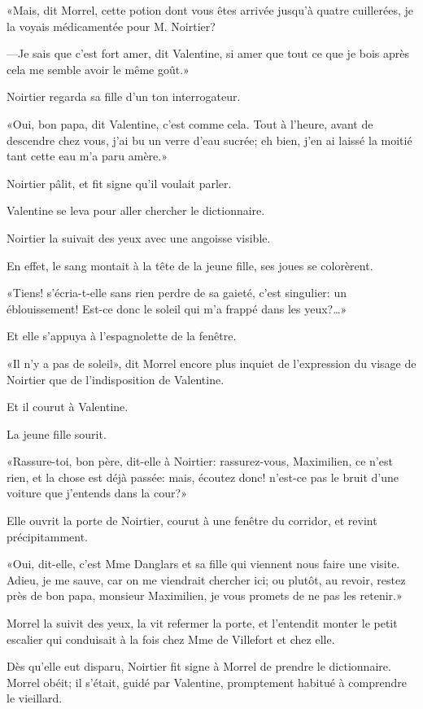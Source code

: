 «Mais, dit Morrel, cette potion dont vous êtes arrivée jusqu'à quatre cuillerées, je la voyais médicamentée pour M. Noirtier? 

—Je sais que c'est fort amer, dit Valentine, si amer que tout ce que je bois après cela me semble avoir le même goût.» 

Noirtier regarda sa fille d'un ton interrogateur. 

«Oui, bon papa, dit Valentine, c'est comme cela. Tout à l'heure, avant de descendre chez vous, j'ai bu un verre d'eau sucrée; eh bien, j'en ai laissé la moitié tant cette eau m'a paru amère.» 

Noirtier pâlit, et fit signe qu'il voulait parler. 

Valentine se leva pour aller chercher le dictionnaire. 

Noirtier la suivait des yeux avec une angoisse visible. 

En effet, le sang montait à la tête de la jeune fille, ses joues se colorèrent. 

«Tiens! s'écria-t-elle sans rien perdre de sa gaieté, c'est singulier: un éblouissement! Est-ce donc le soleil qui m'a frappé dans les yeux?\dots» 

Et elle s'appuya à l'espagnolette de la fenêtre. 

«Il n'y a pas de soleil», dit Morrel encore plus inquiet de l'expression du visage de Noirtier que de l'indisposition de Valentine. 

Et il courut à Valentine. 

La jeune fille sourit. 

«Rassure-toi, bon père, dit-elle à Noirtier: rassurez-vous, Maximilien, ce n'est rien, et la chose est déjà passée: mais, écoutez donc! n'est-ce pas le bruit d'une voiture que j'entends dans la cour?» 

Elle ouvrit la porte de Noirtier, courut à une fenêtre du corridor, et revint précipitamment. 

«Oui, dit-elle, c'est Mme Danglars et sa fille qui viennent nous faire une visite. Adieu, je me sauve, car on me viendrait chercher ici; ou plutôt, au revoir, restez près de bon papa, monsieur Maximilien, je vous promets de ne pas les retenir.» 

Morrel la suivit des yeux, la vit refermer la porte, et l'entendit monter le petit escalier qui conduisait à la fois chez Mme de Villefort et chez elle. 

Dès qu'elle eut disparu, Noirtier fit signe à Morrel de prendre le dictionnaire. Morrel obéit; il s'était, guidé par Valentine, promptement habitué à comprendre le vieillard. 

